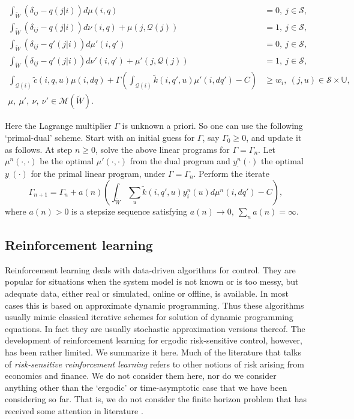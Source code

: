 \documentclass[notitlepage,11pt,reqno]{amsart}
\numberwithin{equation}{section}
\theoremstyle{plain}
\theoremstyle{definition}
\theoremstyle{remark}
\newcommand{\Act}{{\mathds{U}}}
\newcommand{\cS}{{\mathcal{S}}}     %
\newcommand{\PW}{\mathcal{M}(\widetilde{W})}
\begin{document}
\begin{align}
\int_{\widetilde{W}}
(\delta_{ij} - q(j|i))d\mu(i,q) &= 0, \ j\in\cS,\nonumber 
\\
\int_{\widetilde{W}}(\delta_{ij} - q(j|i))d\nu(i,q) + \mu(j,\mathcal{Q}(j)) &= 1, \ j\in\cS, \nonumber \\
\int_{\widetilde{W}}
(\delta_{ij} - q'(j|i))d\mu'(i,q') &= 0, \ j\in\cS,\nonumber 
\\
\int_{\widetilde{W}}(\delta_{ij} - q'(j|i))d\nu'(i,q') + \mu'(j,\mathcal{Q}(j)) &= 1, \ j\in\cS, \nonumber \\
\int_{\mathcal{Q}(i)}\tilde{c}(i,q,u)\mu(i,dq) + \Gamma\left(\int_{\mathcal{Q}(i)}\tilde{k}(i,q',u)\mu'(i,dq') - C\right) &\geq w_{i}, \ (j,u)\in\cS\times\Act, \nonumber\\
\mu, \ \mu', \ \nu, \ \nu' \in\PW.   & \ \nonumber
\end{align}

\bigskip

Here the Lagrange multiplier $\Gamma$ is unknown a priori. So one can use the following `primal-dual' scheme. Start with an initial guess for $\Gamma$, say $\Gamma_0 \geq 0$, and update it as follows. At step $n\geq 0$, solve the above linear programs for $\Gamma = \Gamma_n$. Let $\mu^n(\cdot, \cdot)$ be the optimal $\mu'(\cdot, \cdot)$ from the dual program and $y^n_\cdot(\cdot)$  the optimal $y_\cdot(\cdot)$ for the primal linear program, under $\Gamma = \Gamma_n$. Perform the iterate
$$\Gamma_{n+1} = \Gamma_n + a(n)\left(\int_{\widetilde{W}}\sum_u\tilde{k}(i,q',u)y_i^n(u)d\mu^n(i,dq') - C\right),$$
where $a(n) > 0$ is a stepsize sequence satisfying $a(n)\to 0, \ \sum_na(n) = \infty$.




\subsection{Reinforcement learning}
Reinforcement learning deals with data-driven algorithms for control. They are popular for situations when the system model is not known or is too messy, but adequate data, either real or simulated, online or offline, is available.  In most cases this is based on approximate dynamic programming. Thus these algorithms  usually  mimic classical iterative schemes for solution of dynamic programming equations. In fact they are usually stochastic approximation versions thereof. The development of reinforcement learning for ergodic risk-sensitive control, however, has been rather limited. We summarize it here. Much of the literature that talks of {\it risk-sensitive reinforcement learning} refers to other notions of risk arising from economics and finance. We do not consider them here, nor do we consider anything other than  the `ergodic' or time-asymptotic case that we have been considering so far. 
That is, we do not consider the finite horizon problem that has received some attention in literature \cite{Zaoran}.
\end{document}
